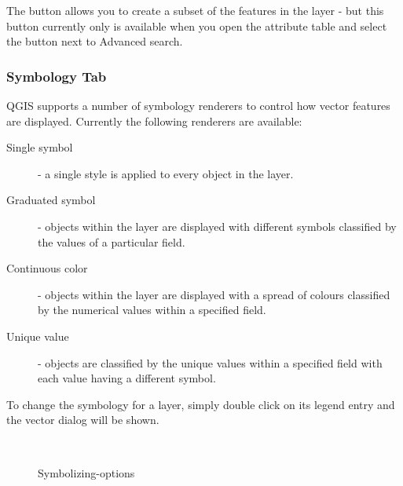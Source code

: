The  button allows you to create a subset of the features 
in the layer - but this button currently only is available when you open the 
attribute table and select the  button next to Advanced search.

\subsubsection{Symbology Tab}\label{sec:symbology}

QGIS supports a number of symbology renderers to control how
vector features are displayed. Currently the following renderers
are available:

\begin{description} 
    \item[Single symbol] - a single style is applied to every
    object in the layer.
    \item[Graduated symbol] - objects within the layer are
    displayed with different symbols classified by the values of a
    particular field.
    \item[Continuous color] - objects within the layer are
    displayed with a spread of colours classified by the numerical
    values within a specified field.
    \item[Unique value] - objects are classified by the unique
    values within a specified field with each value having a
    different symbol.
\end{description}

To change the symbology for a layer, simply double click on its legend 
entry and the vector  dialog will be 
shown.

\begin{figure}[h]
\centering
\caption{Symbolizing-options \nixcaption}
   \goodgap
   \\
   \goodgap
\end{figure}

